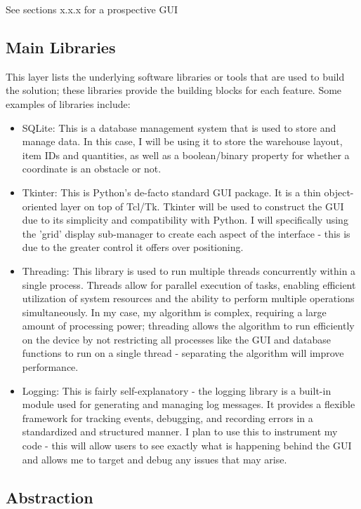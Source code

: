 See sections x.x.x for a prospective GUI

\newpage

\subsection{Main Libraries}

This layer lists the underlying software libraries or tools that are used to build the solution; these libraries provide the building blocks for each feature. Some examples of libraries include:
\begin{itemize}
    \item SQLite: This is a database management system that is used to store and manage data. In this case, I will be using it to store the warehouse layout, item IDs and quantities, as well as a boolean/binary property for whether a coordinate is an obstacle or not.
    \item Tkinter: This is Python's de-facto standard GUI package. It is a thin object-oriented layer on top of Tcl/Tk. Tkinter will be used to construct the GUI due to its simplicity and compatibility with Python. I will specifically using the 'grid' display sub-manager to create each aspect of the interface - this is due to the greater control it offers over positioning.
    \item Threading: This library is used to run multiple threads concurrently within a single process. Threads allow for parallel execution of tasks, enabling efficient utilization of system resources and the ability to perform multiple operations simultaneously. In my case, my algorithm is complex, requiring a large amount of processing power; threading allows the algorithm to run efficiently on the device by not restricting all processes like the GUI and database functions to run on a single thread - separating the algorithm will improve performance.
    \item Logging: This is fairly self-explanatory - the logging library is a built-in module used for generating and managing log messages. It provides a flexible framework for tracking events, debugging, and recording errors in a standardized and structured manner. I plan to use this to instrument my code - this will allow users to see exactly what is happening behind the GUI and allows me to target and debug any issues that may arise.

\end{itemize}

\subsection{Abstraction}

